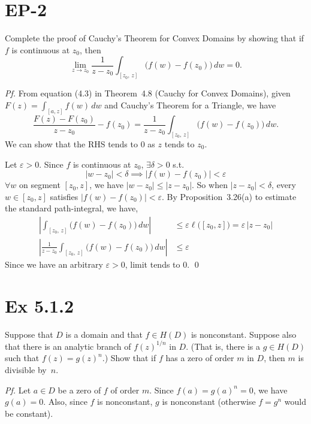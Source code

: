 \documentclass[a4paper]{article}
\begin{document}
\section*{EP-2}

\begin{tcolorbox}[colback=gray!10, colframe=black, boxrule=0.5pt, arc=2mm]
Complete the proof of Cauchy's Theorem for Convex Domains by showing that
if $f$ is continuous at $z_0$, then
\[
  \lim_{z\to z_0}\frac{1}{z-z_0}\int_{[z_0,\,z]}\bigl(f(w)-f(z_0)\bigr)\,dw = 0.
\]
\end{tcolorbox}

\textit{Pf.} From equation (4.3) in Theorem~4.8 (Cauchy for Convex Domains), given $F(z)=\int_{[a,z]}f(w)\,dw$ and Cauchy's Theorem for a Triangle, we have
\[
  \frac{F(z)-F(z_0)}{z-z_0}-f(z_0)
  = \frac{1}{z-z_0}\int_{[z_0,\,z]}\bigl(f(w)-f(z_0)\bigr)\,dw.
\]
We can show that the RHS tends to $0$ as $z$ tends to $z_0$.

\medskip
Let $\varepsilon>0$. Since $f$ is continuous at $z_0$, $\exists\delta>0$ s.t.
\[
  |w-z_0|<\delta \implies |f(w)-f(z_0)|<\varepsilon
\]
$\forall w$ on segment $[z_0,z]$, we have $|w-z_0|\le|z-z_0|$.
So when $|z-z_0|<\delta$, every $w\in[z_0,z]$ satisfies $|f(w)-f(z_0)|<\varepsilon$.
By Proposition~3.26(a) to estimate the standard path-integral, we have,
\begin{align*}
  \left|\int_{[z_0,\,z]}\bigl(f(w)-f(z_0)\bigr)\,dw\right|
  &\le \varepsilon\ell\bigl([z_0,z]\bigr)
  = \varepsilon\,|z-z_0| \\
  \left|\frac{1}{z-z_0}\int_{[z_0,\,z]}\bigl(f(w)-f(z_0)\bigr)\,dw\right|
  &\le \varepsilon
\end{align*}
Since we have an arbitrary $\varepsilon>0$, limit tends to $0$. \qed

\newpage
\section*{Ex 5.1.2}

\begin{tcolorbox}[colback=gray!10, colframe=black, boxrule=0.5pt, arc=2mm]
Suppose that $D$ is a domain and that $f\in H(D)$ is nonconstant.  Suppose
also that there is an analytic branch of $f(z)^{1/n}$ in $D$.  (That is, there is a
$g\in H(D)$ such that $f(z)=g(z)^n$.)  Show that if $f$ has a zero of order $m$
in $D$, then $m$ is divisible by~$n$.
\end{tcolorbox}

\textit{Pf.} Let $a\in D$ be a zero of $f$ of order $m$.
Since $f(a)=g(a)^n=0$, we have $g(a)=0$.
Also, since $f$ is nonconstant, $g$ is nonconstant (otherwise $f=g^n$ would be constant).
\end{document}
